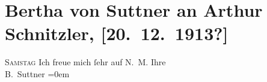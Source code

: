 

         \renewcommand{\erwaehnteOrte}{Orte: Wien}
         \renewcommand{\erwaehnteWerke}{}
               \section[Bertha von Suttner an Arthur Schnitzler, {[}20. 12. 1913?{]}]{ Bertha von Suttner an Arthur Schnitzler, {[}20. 12. 1913?{]}}\nopagebreak{}\rehead{ }\begin{ledgroupsized}[t]{13cm}\normalsize\beginnumbering \toendnotes[C]{\smallbreak\pagebreak[2]} 
\toendnotes[C]{\smallbreak}\pstart
           \raggedleft{}{\pb}\textsc{Samstag}\pend
           \pstart
           Ich freue mich ſehr auf \label{K_L02164_1v}\label{K_L02164_1h}{ }N. M.\pend
           \pstart
           Ihre{\\[\baselineskip]}\spacefill\mbox{B. Suttner}\pend
           \leftskip=0em{}
         
         \endnumbering{}\end{ledgroupsized}  \newcommand{\dateiname}{L02164}\newcommand{\titel}{Bertha von Suttner an Arthur Schnitzler, [20. 12. 1913?]}\newcommand{\editorInnen}{Martin Anton Müller und Gerd-Hermann Susen}
      